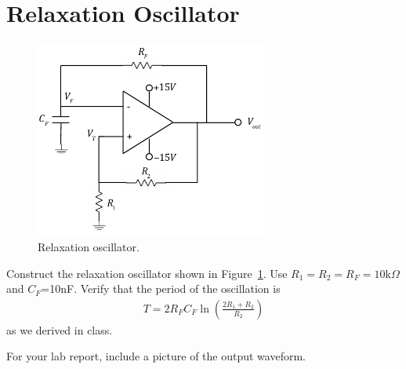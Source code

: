 \documentclass[12pt]{article}
\begin{document}
\section*{Relaxation Oscillator}

\begin{figure}[h!]
\centerline{\includegraphics[width=3in]{figs/relaxation.pdf}}
\caption{Relaxation oscillator.}
\label{fig:relaxation}
\end{figure}

Construct the relaxation oscillator shown in Figure~\ref{fig:relaxation}.  Use $R_1=R_2=R_F=10$k$\Omega$ and $C_F$=10nF.  Verify that
the period of the oscillation is
\begin{align*}
T=2R_FC_F\ln\left(\frac{2R_1+R_2}{R_2}\right)
\end{align*}
as we derived in class.

For your lab report, include a picture of the output waveform.
\end{document}

